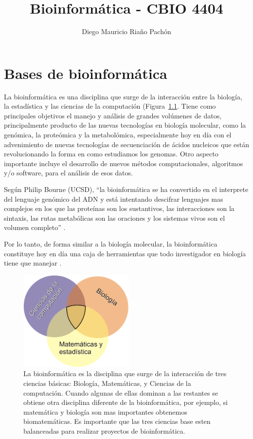 \documentclass[letter,11pt]{book}
\author{Diego Mauricio Ria\~{n}o Pach\'{o}n}
\title{Bioinformática - CBIO 4404}
\begin{document}
\maketitle
\tableofcontents
\listoffigures

\chapter{Bases de bioinformática}
La bioinformática es una disciplina que surge de la interacción entre la biología, la estadística y las ciencias de la computación (Figura~\ref{bioinf}. Tiene como principales objetivos el manejo y análisis de grandes volúmenes de datos, principalmente producto de las nuevas tecnologías en biología molecular, como la genómica, la proteómica y la metabolómica, especialmente hoy en día con el advenimiento de nuevas tecnologías de secuenciación de ácidos nucleicos que están re\-vo\-lu\-cionando la forma en como estudiamos los genomas. Otro aspecto importante incluye el desarrollo de nuevos métodos computacionales, algoritmos y/o software, para el análisis de esos datos.

Según Philip Bourne (UCSD), ``la bioinformática se ha convertido en el interprete del lenguaje genómico del ADN y está intentando descifrar lenguajes mas complejos en los que las proteínas son los sustantivos, las interacciones son la sintaxis, las rutas metabólicas son las oraciones y los sistemas vivos son el volumen completo'' \citep{Bourne2004}.

Por lo tanto, de forma similar a la biología molecular, la bioinformática constituye hoy en día una caja de herramientas que todo investigador en biología tiene que manejar \citetext{\citealp{Stein2008} presenta un punto de vista muy interesante}.

\begin{figure}[h]
\centering
   \includegraphics[height=5cm]{Figs/Bioinformatica.png}
  \caption[{\textquestiondown}Que es la bioinformática?]{\label{bioinf}La bioinformática es la disciplina que surge de la interacción de tres ciencias básicas: Biología, Matemáticas, y Ciencias de la computación. Cuando algunas de ellas dominan a las restantes se obtiene otra disciplina diferente de la bioinformática, por ejemplo, si matemática y biología son mas importantes obtenemos biomatemáticas. Es importante que las tres ciencias base esten balanceadas para realizar proyectos de bioinformática.}
\end{figure}
\end{document}
